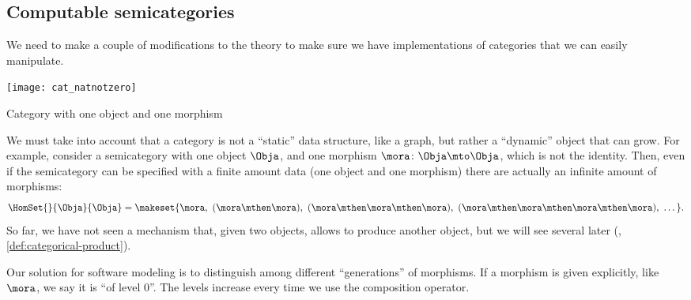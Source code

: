 \label{sec:exercise-semicategories}

\subsection{Computable semicategories}

We need to make a couple of modifications to the theory to make sure we have implementations of categories that we can easily manipulate.

\begin{marginfigure}
    \texttt{[image: cat\_natnotzero]}
    \caption{Category with one object and one morphism}
    \label{fig:cat_natnotzero1}
\end{marginfigure}


We must take into account that a category is not a ``static'' data structure, like a graph, but rather a ``dynamic'' object that can grow.
For example, consider a semicategory with one object $\Obja$, and one morphism $\mora\colon\Obja \mto \Obja$, which is not the identity.
Then, even if the semicategory can be specified with a finite amount data (one object and one morphism) there are actually an infinite amount of morphisms:
\begin{equation}
    \HomSet{}{\Obja}{\Obja} = \makeset{\mora,\  (\mora\mthen\mora),\  (\mora\mthen\mora\mthen\mora),\  (\mora\mthen\mora\mthen\mora\mthen\mora),\  \dots}.
\end{equation}
So far, we have not seen a mechanism that, given two objects, allows to produce another object, but we will see several later (\eg, \cref{def:categorical-product}).

Our solution for software modeling is to distinguish among different ``generations'' of morphisms.
If a morphism is given explicitly, like $\mora$, we say it is ``of level 0''.
The levels increase every time we use the composition operator.

